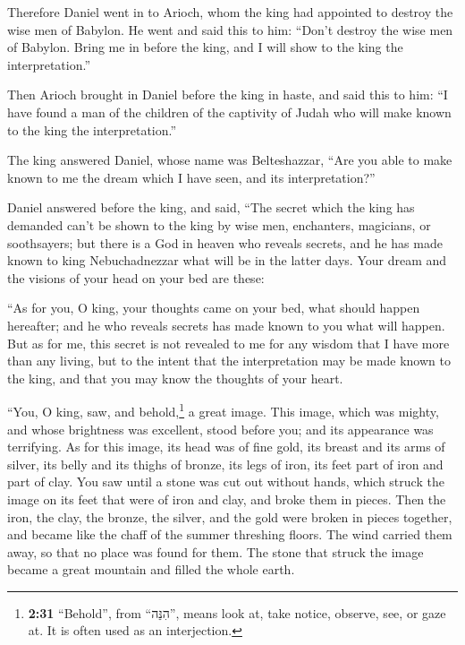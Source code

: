  Therefore Daniel went in to Arioch, whom the king had
appointed to destroy the wise men of Babylon. He went and said this to
him: ``Don't destroy the wise men of Babylon. Bring me in before the
king, and I will show to the king the interpretation.''

 Then Arioch brought in Daniel before the king in haste,
and said this to him: ``I have found a man of the children of the
captivity of Judah who will make known to the king the interpretation.''

 The king answered Daniel, whose name was Belteshazzar,
``Are you able to make known to me the dream which I have seen, and its
interpretation?''

 Daniel answered before the king, and said, ``The secret
which the king has demanded can't be shown to the king by wise men,
enchanters, magicians, or soothsayers;  but there is a
God in heaven who reveals secrets, and he has made known to king
Nebuchadnezzar what will be in the latter days. Your dream and the
visions of your head on your bed are these:

 ``As for you, O king, your thoughts came on your bed,
what should happen hereafter; and he who reveals secrets has made known
to you what will happen.  But as for me, this secret is
not revealed to me for any wisdom that I have more than any living, but
to the intent that the interpretation may be made known to the king, and
that you may know the thoughts of your heart.

 ``You, O king, saw, and behold,\footnote{\textbf{2:31}
  ``Behold'', from ``הִנֵּה'', means look at, take notice, observe, see,
  or gaze at. It is often used as an interjection.} a great image. This
image, which was mighty, and whose brightness was excellent, stood
before you; and its appearance was terrifying.  As for
this image, its head was of fine gold, its breast and its arms of
silver, its belly and its thighs of bronze,  its legs of
iron, its feet part of iron and part of clay.  You saw
until a stone was cut out without hands, which struck the image on its
feet that were of iron and clay, and broke them in pieces.
 Then the iron, the clay, the bronze, the silver, and the
gold were broken in pieces together, and became like the chaff of the
summer threshing floors. The wind carried them away, so that no place
was found for them. The stone that struck the image became a great
mountain and filled the whole earth.

